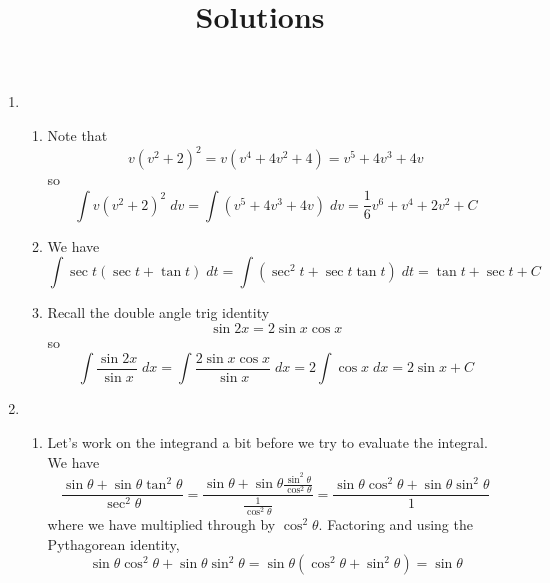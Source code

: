 \documentclass{article}
\title{\commonPSTitleZeroFourFour\ Solutions}
\author{\commonAuthor}
\date{\commonDateZeroFourFour}
\begin{document}
\maketitle
\begin{enumerate}
\item
  \begin{enumerate}
  \item Note that
    \begin{equation*}
      v(v^2+2)^2 = v(v^4 + 4v^2 + 4) = v^5 + 4v^3 + 4v
    \end{equation*}
    so
    \begin{equation*}
      \int v(v^2+2)^2 \; dv = \int (v^5 +4v^3 + 4v) \; dv
      = \frac{1}{6} v^6 + v^4 + 2v^2 + C
    \end{equation*}
  \item We have
    \begin{equation*}
      \int \sec t (\sec t + \tan t) \; dt
      = \int (\sec^2 t + \sec t \tan t) \; dt
      = \tan t + \sec t + C
    \end{equation*}
  \item Recall the double angle trig identity
    \begin{equation*}
      \sin 2x = 2 \sin x \cos x
    \end{equation*}
    so
    \begin{equation*}
      \int \frac{\sin 2x}{\sin x} \; dx
      = \int \frac{2 \sin x \cos x}{\sin x} \; dx
      = 2 \int \cos x \; dx
      = 2 \sin x + C
    \end{equation*}
  \end{enumerate}
\item
  \begin{enumerate}
  \item Let's work on the integrand a bit before we try to evaluate
    the integral.  We have
    \begin{equation*}
      \frac{\sin\theta + \sin\theta\tan^2\theta}{\sec^2\theta}
      = \frac{\sin\theta + \sin\theta
        \frac{\sin^2\theta}{\cos^2\theta}}{\frac{1}{\cos^2\theta}}
      = \frac{\sin\theta\cos^2\theta + \sin\theta\sin^2\theta}{1}
    \end{equation*}
    where we have multiplied through by $\cos^2\theta$.  Factoring
    and using the Pythagorean identity,
    \begin{equation*}
      \sin\theta\cos^2\theta + \sin\theta\sin^2\theta
      = \sin\theta (\cos^2\theta + \sin^2\theta) = \sin\theta
    \end{equation*}

\end{enumerate}
\end{enumerate}
\end{document}
